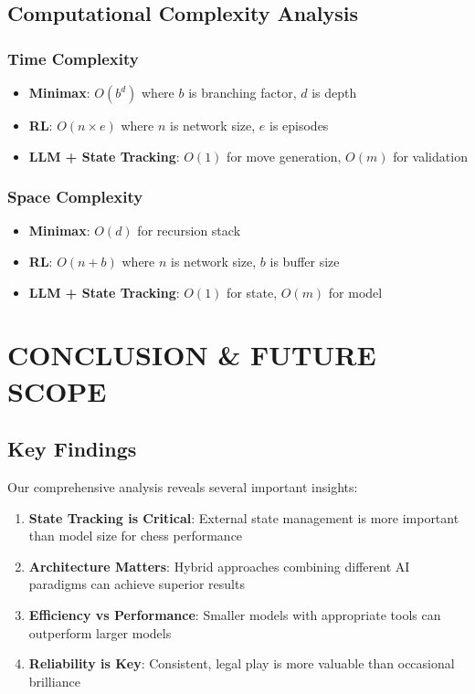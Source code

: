 \documentclass[11pt,a4paper]{report}
\begin{document}
\section{Computational Complexity Analysis}

\subsection{Time Complexity}
\begin{itemize}
    \item \textbf{Minimax}: $O(b^d)$ where $b$ is branching factor, $d$ is depth
    \item \textbf{RL}: $O(n \times e)$ where $n$ is network size, $e$ is episodes
    \item \textbf{LLM + State Tracking}: $O(1)$ for move generation, $O(m)$ for validation
\end{itemize}

\subsection{Space Complexity}
\begin{itemize}
    \item \textbf{Minimax}: $O(d)$ for recursion stack
    \item \textbf{RL}: $O(n + b)$ where $n$ is network size, $b$ is buffer size
    \item \textbf{LLM + State Tracking}: $O(1)$ for state, $O(m)$ for model
\end{itemize}

\chapter{CONCLUSION \& FUTURE SCOPE}
\thispagestyle{fancy}

\section{Key Findings}
Our comprehensive analysis reveals several important insights:

\begin{enumerate}
    \item \textbf{State Tracking is Critical}: External state management is more important than model size for chess performance
    \item \textbf{Architecture Matters}: Hybrid approaches combining different AI paradigms can achieve superior results
    \item \textbf{Efficiency vs Performance}: Smaller models with appropriate tools can outperform larger models
    \item \textbf{Reliability is Key}: Consistent, legal play is more valuable than occasional brilliance
\end{enumerate}
\end{document}
